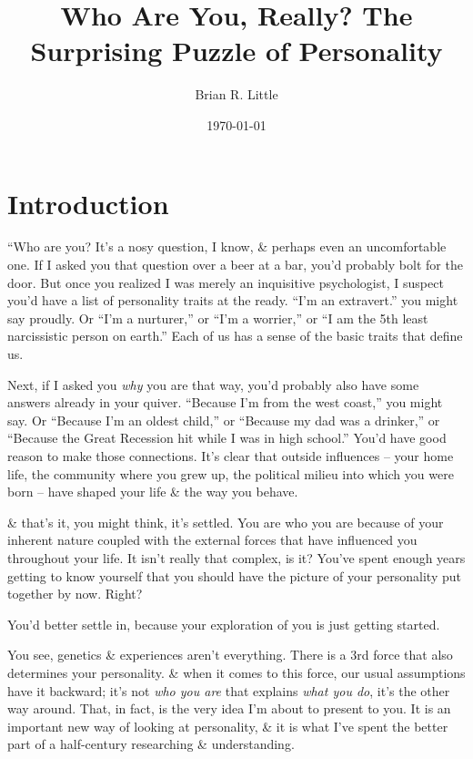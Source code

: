 \documentclass{article}
\title{Who Are You, Really? The Surprising Puzzle of Personality}
\author{Brian R. Little}
\date{\today}
\numberwithin{equation}{section}
\begin{document}
\maketitle
\tableofcontents


\section*{Introduction}
``Who are you? It's a nosy question, I know, \& perhaps even an uncomfortable one. If I asked you that question over a beer at a bar, you'd probably bolt for the door. But once you realized I was merely an inquisitive psychologist, I suspect you'd have a list of personality traits at the ready. ``I'm an extravert.'' you might say proudly. Or ``I'm a nurturer,'' or ``I'm a worrier,'' or ``I am the 5th least narcissistic person on earth.'' Each of us has a sense of the basic traits that define us.

Next, if I asked you \textit{why} you are that way, you'd probably also have some answers already in your quiver. ``Because I'm from the west coast,'' you might say. Or ``Because I'm an oldest child,'' or ``Because my dad was a drinker,'' or ``Because the Great Recession hit while I was in high school.'' You'd have good reason to make those connections. It's clear that outside influences -- your home life, the community where you grew up, the political milieu into which you were born -- have shaped your life \& the way you behave.

\& that's it, you might think, it's settled. You are who you are because of your inherent nature coupled with the external forces that have influenced you throughout your life. It isn't really that complex, is it? You've spent enough years getting to know yourself that you should have the picture of your personality put together by now. Right?

You'd better settle in, because your exploration of you is just getting started.

You see, genetics \& experiences aren't everything. There is a 3rd force that also determines your personality. \& when it comes to this force, our usual assumptions have it backward; it's not \textit{who you are} that explains \textit{what you do}, it's the other way around. That, in fact, is the very idea I'm about to present to you. It is an important new way of looking at personality, \& it is what I've spent the better part of a half-century researching \& understanding.
\end{document}
